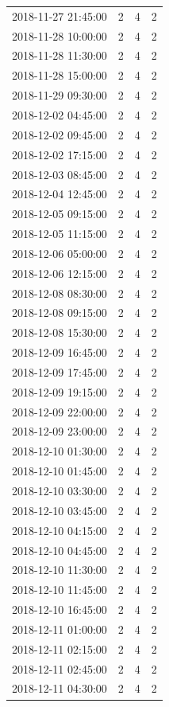 \begin{tabular}{lrrr}
2018-11-27 21:45:00 & 2 & 4 & 2 \\
2018-11-28 10:00:00 & 2 & 4 & 2 \\
2018-11-28 11:30:00 & 2 & 4 & 2 \\
2018-11-28 15:00:00 & 2 & 4 & 2 \\
2018-11-29 09:30:00 & 2 & 4 & 2 \\
2018-12-02 04:45:00 & 2 & 4 & 2 \\
2018-12-02 09:45:00 & 2 & 4 & 2 \\
2018-12-02 17:15:00 & 2 & 4 & 2 \\
2018-12-03 08:45:00 & 2 & 4 & 2 \\
2018-12-04 12:45:00 & 2 & 4 & 2 \\
2018-12-05 09:15:00 & 2 & 4 & 2 \\
2018-12-05 11:15:00 & 2 & 4 & 2 \\
2018-12-06 05:00:00 & 2 & 4 & 2 \\
2018-12-06 12:15:00 & 2 & 4 & 2 \\
2018-12-08 08:30:00 & 2 & 4 & 2 \\
2018-12-08 09:15:00 & 2 & 4 & 2 \\
2018-12-08 15:30:00 & 2 & 4 & 2 \\
2018-12-09 16:45:00 & 2 & 4 & 2 \\
2018-12-09 17:45:00 & 2 & 4 & 2 \\
2018-12-09 19:15:00 & 2 & 4 & 2 \\
2018-12-09 22:00:00 & 2 & 4 & 2 \\
2018-12-09 23:00:00 & 2 & 4 & 2 \\
2018-12-10 01:30:00 & 2 & 4 & 2 \\
2018-12-10 01:45:00 & 2 & 4 & 2 \\
2018-12-10 03:30:00 & 2 & 4 & 2 \\
2018-12-10 03:45:00 & 2 & 4 & 2 \\
2018-12-10 04:15:00 & 2 & 4 & 2 \\
2018-12-10 04:45:00 & 2 & 4 & 2 \\
2018-12-10 11:30:00 & 2 & 4 & 2 \\
2018-12-10 11:45:00 & 2 & 4 & 2 \\
2018-12-10 16:45:00 & 2 & 4 & 2 \\
2018-12-11 01:00:00 & 2 & 4 & 2 \\
2018-12-11 02:15:00 & 2 & 4 & 2 \\
2018-12-11 02:45:00 & 2 & 4 & 2 \\
2018-12-11 04:30:00 & 2 & 4 & 2 \\

\end{tabular}
